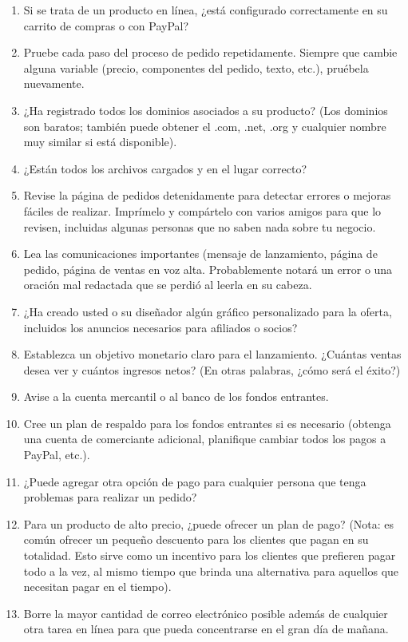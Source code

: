 \documentclass[10pt]{book}
\begin{document}
\begin{enumerate}[\bfseries 1.]
		\item Si se trata de un producto en línea, ¿está configurado correctamente en su carrito de compras o con PayPal?
		\item Pruebe cada paso del proceso de pedido repetidamente. Siempre que cambie alguna variable (precio, componentes del pedido, texto, etc.), pruébela nuevamente.
		\item ¿Ha registrado todos los dominios asociados a su producto? (Los dominios son baratos; también puede obtener el .com, .net, .org y cualquier nombre muy similar si está disponible).
		\item ¿Están todos los archivos cargados y en el lugar correcto?
		\item Revise la página de pedidos detenidamente para detectar errores o mejoras fáciles de realizar. Imprímelo y compártelo con varios amigos para que lo revisen, incluidas algunas personas que no saben nada sobre tu negocio.
		\item Lea las comunicaciones importantes (mensaje de lanzamiento, página de pedido, página de ventas en voz alta. Probablemente notará un error o una oración mal redactada que se perdió al leerla en su cabeza.
		\item ¿Ha creado usted o su diseñador algún gráfico personalizado para la oferta, incluidos los anuncios necesarios para afiliados o socios?
		\item Establezca un objetivo monetario claro para el lanzamiento. ¿Cuántas ventas desea ver y cuántos ingresos netos? (En otras palabras, ¿cómo será el éxito?)
		\item Avise a la cuenta mercantil o al banco de los fondos entrantes.
		\item Cree un plan de respaldo para los fondos entrantes si es necesario (obtenga una cuenta de comerciante adicional, planifique cambiar todos los pagos a PayPal, etc.).
		\item ¿Puede agregar otra opción de pago para cualquier persona que tenga problemas para realizar un pedido?
		\item Para un producto de alto precio, ¿puede ofrecer un plan de pago? (Nota: es común ofrecer un pequeño descuento para los clientes que pagan en su totalidad. Esto sirve como un incentivo para los clientes que prefieren pagar todo a la vez, al mismo tiempo que brinda una alternativa para aquellos que necesitan pagar en el tiempo).
		\item Borre la mayor cantidad de correo electrónico posible además de cualquier otra tarea en línea para que pueda concentrarse en el gran día de mañana.

\end{enumerate}
\end{document}
